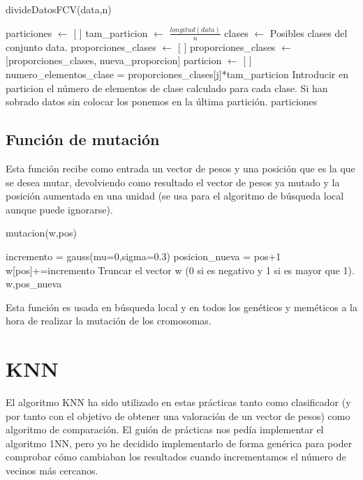 \documentclass[12pt,a4paper]{article}
\begin{document}
	\begin{algorithm}[!h]
		\caption{divideDatosFCV(data,n)}
		\begin{algorithmic}
			\STATE particiones $\leftarrow$ [ ]
			\STATE tam\_particion $\leftarrow$ $\frac{longitud(data)}{n}$
			\STATE clases $\leftarrow$ Posibles clases del conjunto data.
			\STATE proporciones\_clases $\leftarrow$ [ ]
			\STATE proporciones\_clases $\leftarrow$ [proporciones\_clases, nueva\_proporcion]
			\ENDFOR
			\STATE particion $\leftarrow$ [ ]
			\STATE numero\_elementos\_clase = proporciones\_clases[j]*tam\_particion
			\STATE Introducir en particion el número de elementos de clase calculado para cada clase.
			\ENDFOR
			\ENDFOR
			\ENDFOR
			\STATE Si han sobrado datos sin colocar los ponemos en la última partición.
			\RETURN particiones
		\end{algorithmic}
	\end{algorithm}
	
	\subsection{Función de mutación}
	
	Esta función recibe como entrada un vector de pesos y una posición que es la que se desea mutar, devolviendo como resultado el vector de pesos ya mutado y la posición aumentada en una unidad (se usa para el algoritmo de búsqueda local aunque puede ignorarse).
	
	\begin{algorithm}[!h]
		\caption{mutacion(w,pos)}
		\begin{algorithmic}
			\STATE incremento = gauss(mu=0,sigma=0.3)
			\STATE posicion\_nueva = pos+1
			\STATE w[pos]+=incremento
			\STATE Truncar el vector w (0 si es negativo y 1 si es mayor que 1).
			\RETURN w,pos\_nueva
		\end{algorithmic}
	\end{algorithm}
	
	Esta función es usada en búsqueda local y en todos los genéticos y meméticos a la hora de realizar la mutación de los cromosomas.
	
	\newpage
		
	\section{KNN}
	\label{sec:knn}
	
	El algoritmo KNN ha sido utilizado en estas prácticas tanto como clasificador (y por tanto con el objetivo de obtener una valoración de un vector de pesos) como algoritmo de comparación.
	El guión de prácticas nos pedía implementar el algoritmo 1NN, pero yo he decidido implementarlo de forma genérica para poder comprobar cómo cambiaban los resultados cuando incrementamos el número de vecinos más cercanos.
	
\end{document}
